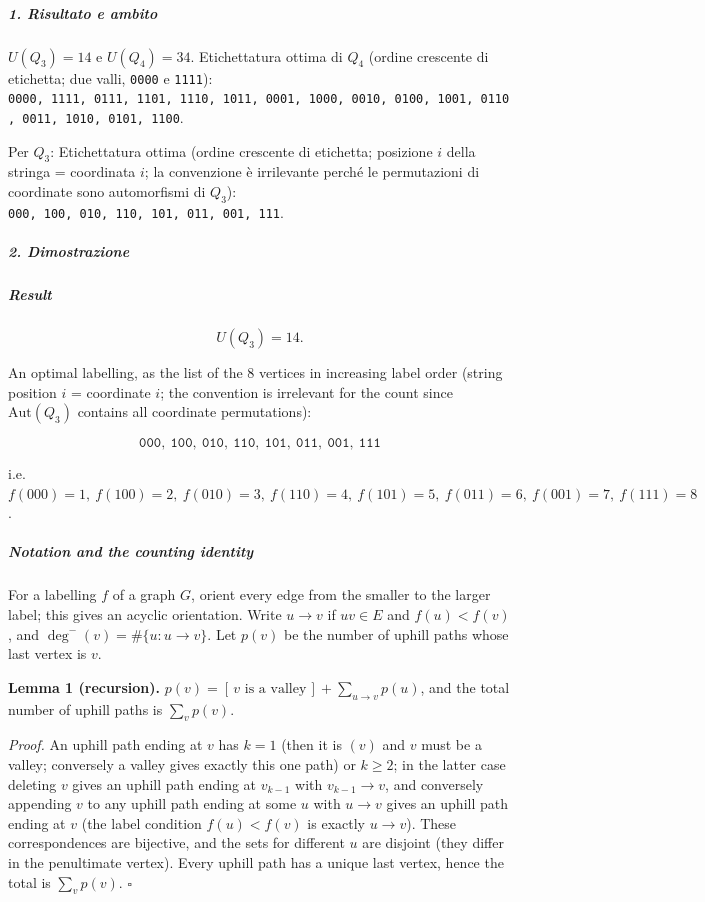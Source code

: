 \documentclass[11pt,a4paper]{article}
\begin{document}
\subparagraph{1. Risultato e ambito}\label{risultato-e-ambito}

\(U(Q_3) = 14\) e \(U(Q_4) = 34\). Etichettatura ottima di \(Q_4\)
(ordine crescente di etichetta; due valli, \texttt{0000} e
\texttt{1111}):
\texttt{0000,\ 1111,\ 0111,\ 1101,\ 1110,\ 1011,\ 0001,\ 1000,\ 0010,\ 0100,\ 1001,\ 0110,\ 0011,\ 1010,\ 0101,\ 1100}.

Per \(Q_3\): Etichettatura ottima (ordine crescente di etichetta;
posizione \(i\) della stringa = coordinata \(i\); la convenzione è
irrilevante perché le permutazioni di coordinate sono automorfismi di
\(Q_3\)): \texttt{000,\ 100,\ 010,\ 110,\ 101,\ 011,\ 001,\ 111}.

\subparagraph{2. Dimostrazione}\label{dimostrazione}

\subparagraph{Result}\label{result}

\[U(Q_3) = 14.\]

An optimal labelling, as the list of the 8 vertices in increasing label
order (string position \(i\) = coordinate \(i\); the convention is
irrelevant for the count since \(\mathrm{Aut}(Q_3)\) contains all
coordinate permutations):

\[\texttt{000},\ \texttt{100},\ \texttt{010},\ \texttt{110},\ \texttt{101},\ \texttt{011},\ \texttt{001},\ \texttt{111}\]

i.e.~\(f(000)=1,\ f(100)=2,\ f(010)=3,\ f(110)=4,\ f(101)=5,\ f(011)=6,\ f(001)=7,\ f(111)=8\).

\subparagraph{Notation and the counting
identity}\label{notation-and-the-counting-identity}

For a labelling \(f\) of a graph \(G\), orient every edge from the
smaller to the larger label; this gives an acyclic orientation. Write
\(u \to v\) if \(uv\in E\) and \(f(u)<f(v)\), and
\(\deg^-(v)=\#\{u: u\to v\}\). Let \(p(v)\) be the number of uphill
paths whose last vertex is \(v\).

\textbf{Lemma 1 (recursion).}
\(p(v) = [\,v \text{ is a valley}\,] + \sum_{u\to v} p(u)\), and the
total number of uphill paths is \(\sum_v p(v)\).

\emph{Proof.} An uphill path ending at \(v\) has \(k=1\) (then it is
\((v)\) and \(v\) must be a valley; conversely a valley gives exactly
this one path) or \(k\ge2\); in the latter case deleting \(v\) gives an
uphill path ending at \(v_{k-1}\) with \(v_{k-1}\to v\), and conversely
appending \(v\) to any uphill path ending at some \(u\) with \(u\to v\)
gives an uphill path ending at \(v\) (the label condition \(f(u)<f(v)\)
is exactly \(u\to v\)). These correspondences are bijective, and the
sets for different \(u\) are disjoint (they differ in the penultimate
vertex). Every uphill path has a unique last vertex, hence the total is
\(\sum_v p(v)\). \(\square\)
\end{document}
